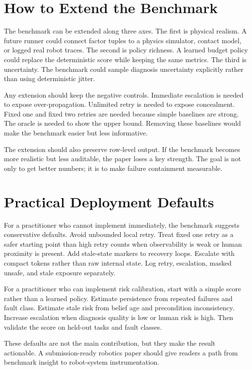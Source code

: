 \section{How to Extend the Benchmark}

The benchmark can be extended along three axes. The first is physical realism. A future runner could connect factor tuples to a physics simulator, contact model, or logged real robot traces. The second is policy richness. A learned budget policy could replace the deterministic score while keeping the same metrics. The third is uncertainty. The benchmark could sample diagnosis uncertainty explicitly rather than using deterministic jitter.

Any extension should keep the negative controls. Immediate escalation is needed to expose over-propagation. Unlimited retry is needed to expose concealment. Fixed one and fixed two retries are needed because simple baselines are strong. The oracle is needed to show the upper bound. Removing these baselines would make the benchmark easier but less informative.

The extension should also preserve row-level output. If the benchmark becomes more realistic but less auditable, the paper loses a key strength. The goal is not only to get better numbers; it is to make failure containment measurable.

\section{Practical Deployment Defaults}

For a practitioner who cannot implement \method immediately, the benchmark suggests conservative defaults. Avoid unbounded local retry. Treat fixed one retry as a safer starting point than high retry counts when observability is weak or human proximity is present. Add stale-state markers to recovery loops. Escalate with compact tokens rather than raw internal state. Log retry, escalation, masked unsafe, and stale exposure separately.

For a practitioner who can implement risk calibration, start with a simple score rather than a learned policy. Estimate persistence from repeated failures and fault class. Estimate stale risk from belief age and precondition inconsistency. Increase escalation when diagnosis quality is low or human risk is high. Then validate the score on held-out tasks and fault classes.

These defaults are not the main contribution, but they make the result actionable. A submission-ready robotics paper should give readers a path from benchmark insight to robot-system instrumentation.

